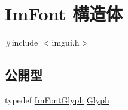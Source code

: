 \hypertarget{struct_im_font}{}\section{Im\+Font 構造体}
\label{struct_im_font}


{\ttfamily \#include $<$imgui.\+h$>$}

\subsection*{公開型}
\begin{DoxyCompactItemize}
\item 
typedef \mbox{\hyperlink{struct_im_font_glyph}{Im\+Font\+Glyph}} \mbox{\hyperlink{struct_im_font_a4b802233ac8d3f3beddc395837288683}{Glyph}}
\end{DoxyCompactItemize}
